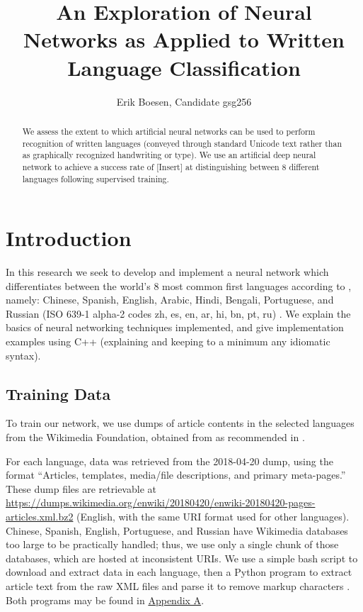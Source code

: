 \documentclass{article}
\begin{document}
\title{An Exploration of Neural Networks as Applied to Written Language Classification}
\author{Erik Boesen, Candidate gsg256}
\maketitle

\begin{abstract}
We assess the extent to which artificial neural networks can be used to perform recognition of written languages (conveyed through standard Unicode text rather than as graphically recognized handwriting or type). We use an artificial deep neural network to achieve a success rate of [Insert] at distinguishing between 8 different languages following supervised training.
\end{abstract}

\section{Introduction}
In this research we seek to develop and implement a neural network which differentiates between the world's 8 most common first languages according to \cite{ethnologue}, namely: Chinese, Spanish, English, Arabic, Hindi, Bengali, Portuguese, and Russian (ISO 639-1 alpha-2 codes zh, es, en, ar, hi, bn, pt, ru) \cite{iso639}. We explain the basics of neural networking techniques implemented, and give implementation examples using C++ (explaining and keeping to a minimum any idiomatic syntax).

\subsection{Training Data}
To train our network, we use dumps of article contents in the selected languages from the Wikimedia Foundation, obtained from \cite{wikidumps} as recommended in \cite{langsamp}. %

For each language, data was retrieved from the 2018-04-20 dump, using the format ``Articles, templates, media/file descriptions, and primary meta-pages.'' These dump files are retrievable at \url{https://dumps.wikimedia.org/enwiki/20180420/enwiki-20180420-pages-articles.xml.bz2} (English, with the same URI format used for other languages). Chinese, Spanish, English, Portuguese, and Russian have Wikimedia databases too large to be practically handled; thus, we use only a single chunk of those databases, which are hosted at inconsistent URIs. We use a simple bash script to download and extract data in each language, then a Python program to extract article text from the raw XML files and parse it to remove markup characters \cite{parsewikixml}. Both programs may be found in \hyperref[sec:appendix_a]{Appendix A}.
\end{document}
